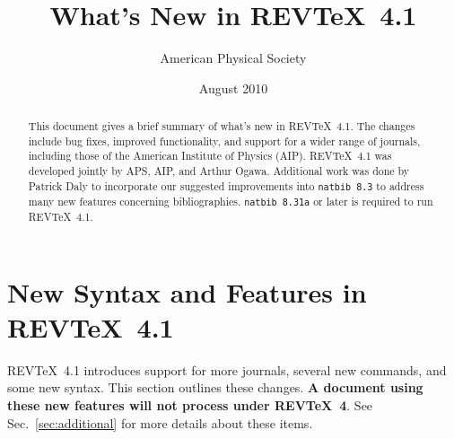\documentclass[%
,twocolumn%
,secnumarabic%
,amssymb,aps,pra,nobibnotes]{revtex4-1}
\DeclareRobustCommand\revtex{REV\TeX}
\begin{document}
\title{What's New in  \revtex~4.1}%
\author{American Physical Society}%
\date{August 2010}%


\begin{abstract}
This document gives a brief summary of what's new in  \revtex~4.1. The changes include bug fixes, improved functionality, and support for a wider range of journals, including those of the American Institute of Physics (AIP). \revtex~4.1 was developed jointly by APS, AIP, and Arthur Ogawa. Additional work was done by Patrick Daly to incorporate our suggested improvements into \texttt{natbib 8.3} to address many new features concerning bibliographies. \texttt{natbib 8.31a} or later is required to run \revtex~4.1.
\end{abstract}
\maketitle

\section{New Syntax and Features in \revtex~4.1}
\revtex~4.1 introduces support for more journals, several new commands, and some new syntax. This section outlines these changes. \textbf{A document using these new features will not process under \revtex~4}. See Sec.~\ref{sec:additional} for more details about these items.
\end{document}
